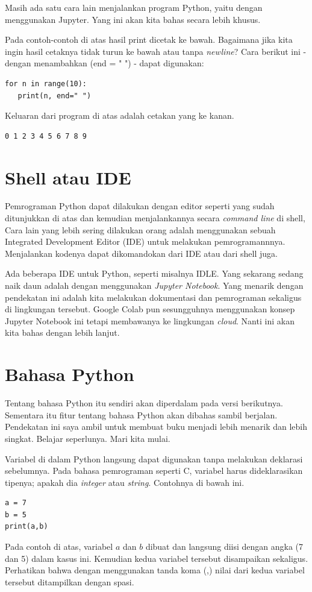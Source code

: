 Masih ada satu cara lain menjalankan program Python, yaitu dengan menggunakan
Jupyter. Yang ini akan kita bahas secara lebih khusus.

Pada contoh-contoh di atas hasil print dicetak ke bawah. Bagaimana jika kita
ingin hasil cetaknya tidak turun ke bawah atau tanpa {\em newline}?
Cara berikut ini - dengan menambahkan (end = " ") - dapat digunakan:

\begin{verbatim}
for n in range(10):
   print(n, end=" ")
\end{verbatim}
Keluaran dari program di atas adalah cetakan yang ke kanan.
\begin{verbatim}
0 1 2 3 4 5 6 7 8 9
\end{verbatim}


\section{Shell atau IDE}
Pemrograman Python dapat dilakukan dengan editor seperti yang sudah ditunjukkan
di atas dan kemudian menjalankannya secara {\em command line} di shell,
Cara lain yang lebih sering dilakukan orang adalah menggunakan sebuah
Integrated Development Editor (IDE) untuk melakukan pemrogramannnya.
Menjalankan kodenya dapat dikomandokan dari IDE atau dari shell juga.

Ada beberapa IDE untuk Python, seperti misalnya IDLE.
Yang sekarang sedang naik daun adalah dengan menggunakan {\em Jupyter Notebook}.
Yang menarik dengan pendekatan ini adalah kita melakukan dokumentasi dan
pemrograman sekaligus di lingkungan tersebut.
Google Colab pun sesungguhnya menggunakan konsep Jupyter Notebook ini tetapi
membawanya ke lingkungan {\em cloud}.
Nanti ini akan kita bahas dengan lebih lanjut.

\section{Bahasa Python} 
Tentang bahasa Python itu sendiri akan diperdalam pada versi berikutnya.
Sementara itu fitur tentang bahasa Python akan dibahas sambil berjalan.
Pendekatan ini saya ambil untuk membuat buku menjadi lebih menarik dan lebih
singkat. Belajar seperlunya. Mari kita mulai.

Variabel di dalam Python langsung dapat digunakan tanpa melakukan deklarasi
sebelumnya. Pada bahasa pemrograman seperti C, variabel harus dideklarasikan
tipenya; apakah dia {\em integer} atau {\em string}.
Contohnya di bawah ini.
\begin{verbatim}
a = 7
b = 5
print(a,b)
\end{verbatim}
Pada contoh di atas, variabel $a$ dan $b$ dibuat dan langsung diisi dengan
angka (7 dan 5) dalam kasus ini.
Kemudian kedua variabel tersebut disampaikan sekaligus.
Perhatikan bahwa dengan menggunakan tanda koma (,) nilai dari kedua variabel
tersebut ditampilkan dengan spasi.

